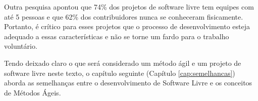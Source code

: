 Outra pesquisa \cite{Reis2003} apontou que 74\% dos projetos de
software livre tem equipes com até 5 pessoas e que 62\% dos
contribuidores nunca se conheceram fisicamente. Portanto, é crítico
para esses projetos que o processo de desenvolvimento esteja adequado
a essas características e não se torne um fardo para o trabalho
voluntário.

Tendo deixado claro o que será considerado um método ágil e um projeto
de software livre neste texto, o capítulo seguinte (Capítulo
\ref{cap:semelhancas}) aborda as semelhanças entre o desenvolvimento
de Software Livre e os conceitos de Métodos Ágeis.
